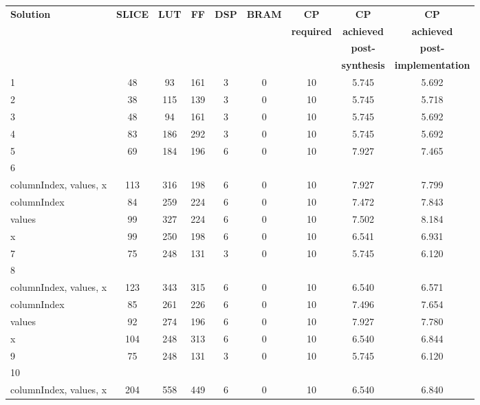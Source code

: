 \begin{table}[H]
	\centering
	\begin{tabular}{|l|c|c|c|c|c|c|c|c|}
		\hline
		\textbf{Solution} & \textbf{SLICE} & \textbf{LUT} & \textbf{FF} & \textbf{DSP} & \textbf{BRAM} & \textbf{CP} & \textbf{CP} & \textbf{CP} \\
		& & & & & & \textbf{required} & \textbf{achieved} & \textbf{achieved}\\
		& & & & & & & \textbf{post-} & \textbf{post-}\\
		& & & & & & & \textbf{synthesis} & \textbf{implementation}\\
		\hline
		1 & 48 & 93 & 161 & 3 & 0 & 10 & 5.745 & 5.692 \\
		\hline
		2 & 38 & 115 & 139 & 3 & 0 & 10 & 5.745 & 5.718 \\
		\hline
		3 & 48 & 94 & 161 & 3 & 0 & 10 & 5.745 & 5.692 \\
		\hline
		4 & 83 & 186 & 292 & 3 & 0 & 10 & 5.745 & 5.692 \\
		\hline
		5 & 69 & 184 & 196 & 6 & 0 & 10 & 7.927 & 7.465 \\
		\hline
		6 &  &  &  &  &  &  &  &  \\
		\tabitem columnIndex, values, x & 113 & 316 & 198 & 6 & 0 & 10 & 7.927 & 7.799 \\
		\tabitem columnIndex & 84 & 259 & 224 & 6 & 0 & 10 & 7.472 & 7.843 \\
		\tabitem values & 99 & 327 & 224 & 6 & 0 & 10 & 7.502 & 8.184 \\
		\tabitem x & 99 & 250 & 198 & 6 & 0 & 10 & 6.541 & 6.931 \\
		\hline
		7 & 75 & 248 & 131 & 3 & 0 & 10 & 5.745 & 6.120 \\
		\hline
		8 &  &  &  &  &  &  &  &  \\
		\tabitem columnIndex, values, x & 123 & 343 & 315 & 6 & 0 & 10 & 6.540 & 6.571 \\
		\tabitem columnIndex & 85 & 261 & 226 & 6 & 0 & 10 & 7.496 & 7.654 \\
		\tabitem values & 92 & 274 & 196 & 6 & 0 & 10 & 7.927 & 7.780 \\
		\tabitem x & 104 & 248 & 313 & 6 & 0 & 10 & 6.540 & 6.844 \\
		\hline
		9 & 75 & 248 & 131 & 3 & 0 & 10 & 5.745 & 6.120 \\
		\hline
		10 &  &  &  &  &  &  &  &  \\
		\tabitem columnIndex, values, x & 204 & 558 & 449 & 6 & 0 & 10 & 6.540 & 6.840 \\

\end{tabular}
\end{table}
